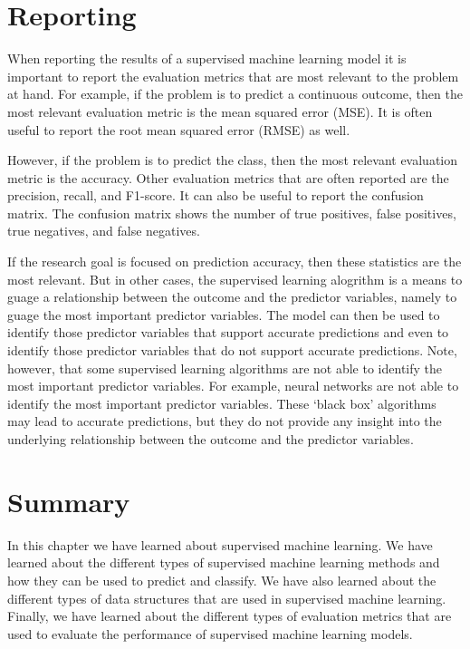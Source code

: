 \documentclass[
  letterpaper,
]{scrbook}
\begin{document}
\hypertarget{pda-reporting}{%
\section{Reporting}\label{pda-reporting}}

When reporting the results of a supervised machine learning model it is
important to report the evaluation metrics that are most relevant to the
problem at hand. For example, if the problem is to predict a continuous
outcome, then the most relevant evaluation metric is the mean squared
error (MSE). It is often useful to report the root mean squared error
(RMSE) as well.

However, if the problem is to predict the class, then the most relevant
evaluation metric is the accuracy. Other evaluation metrics that are
often reported are the precision, recall, and F1-score. It can also be
useful to report the confusion matrix. The confusion matrix shows the
number of true positives, false positives, true negatives, and false
negatives.

If the research goal is focused on prediction accuracy, then these
statistics are the most relevant. But in other cases, the supervised
learning alogrithm is a means to guage a relationship between the
outcome and the predictor variables, namely to guage the most important
predictor variables. The model can then be used to identify those
predictor variables that support accurate predictions and even to
identify those predictor variables that do not support accurate
predictions. Note, however, that some supervised learning algorithms are
not able to identify the most important predictor variables. For
example, neural networks are not able to identify the most important
predictor variables. These `black box' algorithms may lead to accurate
predictions, but they do not provide any insight into the underlying
relationship between the outcome and the predictor variables.

\hypertarget{pda-summary}{%
\section{Summary}\label{pda-summary}}

In this chapter we have learned about supervised machine learning. We
have learned about the different types of supervised machine learning
methods and how they can be used to predict and classify. We have also
learned about the different types of data structures that are used in
supervised machine learning. Finally, we have learned about the
different types of evaluation metrics that are used to evaluate the
performance of supervised machine learning models.
\end{document}
